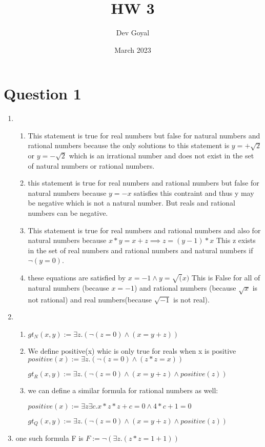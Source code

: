 \documentclass{article}
\title{HW 3}
\author{Dev Goyal}
\date{March 2023}
\begin{document}
\maketitle

\section{Question 1}
\begin{enumerate}[label=(\alph*)]
    \item \begin{enumerate}[label=(\roman*)]
        \item This statement is true for real numbers but false for natural numbers and rational numbers because the only solutions to this statement is $y = +\sqrt{2}$ or $y = -\sqrt{2}$ which is an irrational number and does not exist in the set of natural numbers or rational numbers.
        \item this statement is true for real numbers and rational numbers but false for natural numbers because $y = -x $ satisfies this contraint and thus y may be negative which is not a natural number. But reals and rational numbers can be negative.
        \item This statement is true for real numbers and rational numbers and also for natural numbers because $x*y = x + z \implies z = (y-1) * x$ This z exists in the set of real numbers and rational numbers and natural numbers if $\neg(y = 0)$.
        \item these equations are satisfied by $x = -1 \land y = \sqrt(x)$ This is False for all of natural numbers (because $x = -1$) and rational numbers (because $\sqrt{x}$ is not rational) and real numbers(because $\sqrt{-1}$ is not real).
    \end{enumerate}

    \item \begin{enumerate}[label=(\roman*)]
        \item $gt_{N} (x,y) := \exists z . (\neg(z = 0) \land (x = y + z))$
        \item We define positive(x) whic is only true for reals when x is positive
         $ positive(x) := \exists z . (\neg(z = 0) \land (z*z = x))$

         $gt_{R} (x,y) := \exists z . (\neg(z = 0) \land (x = y + z) \land positive(z))$

         \item we can define a similar formula for rational numbers as well:
         
         $positive(x) := \exists z \exists c.  x * z * z + c = 0 \land 4 * c + 1 = 0 $
         
         $gt_Q(x,y) := \exists z . (\neg(z = 0) \land (x = y + z) \land positive(z)) $ 
    \end{enumerate}

    \item one such formula F is $F := \neg (\exists z. (z * z = 1 + 1))$
\end{enumerate}
\end{document}
